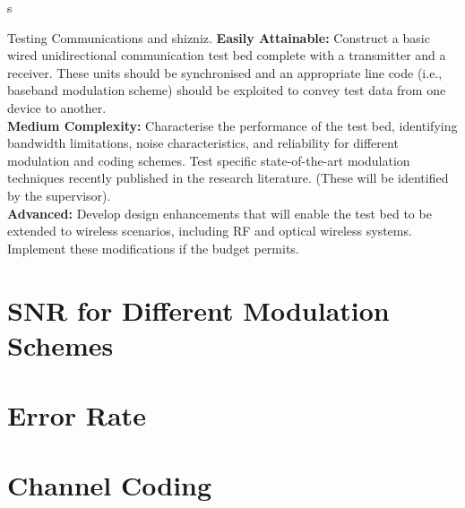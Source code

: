 \documentclass[../main.tex]{subfiles}
\begin{document}
s


Testing Communications and shizniz.
\textbf{Easily Attainable:}
Construct a basic wired unidirectional communication test bed complete with a transmitter and a receiver.
These units should be synchronised and an appropriate line code (i.e., baseband modulation scheme) should be exploited to convey test data from one device to another.\\

\textbf{Medium Complexity:}
Characterise the performance of the test bed, identifying bandwidth limitations, noise characteristics, and reliability for different modulation and coding schemes. Test specific state-of-the-art modulation techniques recently published in the research literature. (These will be identified by the supervisor).\\

\textbf{Advanced:}
Develop design enhancements that will enable the test bed to be extended to wireless scenarios, including RF and optical wireless systems.
Implement these modifications if the budget permits.


\section{SNR for Different Modulation Schemes}



\section{Error Rate}


\section{Channel Coding} \label{sec_Channel Coding}
\end{document}
